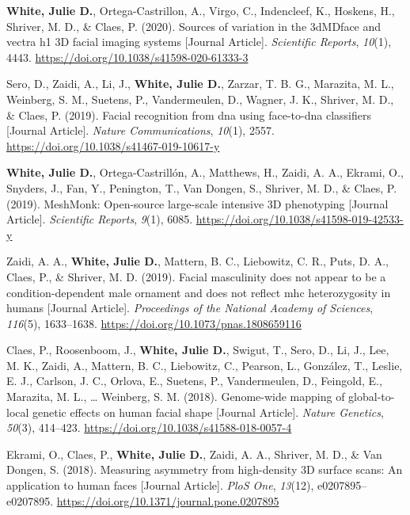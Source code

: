 \documentclass[11pt, a4paper]{awesome-cv}
\begin{document}
\leavevmode\hypertarget{ref-White_2020_CameraVariation}{}%
\textbf{White, Julie D.}, Ortega-Castrillon, A., Virgo, C., Indencleef,
K., Hoskens, H., Shriver, M. D., \& Claes, P. (2020). Sources of
variation in the 3dMDface and vectra h1 3D facial imaging systems
{[}Journal Article{]}. \emph{Scientific Reports}, \emph{10}(1), 4443.
\url{https://doi.org/10.1038/s41598-020-61333-3}

\leavevmode\hypertarget{ref-Sero_2019_FaceToDNA}{}%
Sero, D., Zaidi, A., Li, J., \textbf{White, Julie D.}, Zarzar, T. B. G.,
Marazita, M. L., Weinberg, S. M., Suetens, P., Vandermeulen, D., Wagner,
J. K., Shriver, M. D., \& Claes, P. (2019). Facial recognition from dna
using face-to-dna classifiers {[}Journal Article{]}. \emph{Nature
Communications}, \emph{10}(1), 2557.
\url{https://doi.org/10.1038/s41467-019-10617-y}

\leavevmode\hypertarget{ref-White_2019_MeshMonk}{}%
\textbf{White, Julie D.}, Ortega-Castrillón, A., Matthews, H., Zaidi, A.
A., Ekrami, O., Snyders, J., Fan, Y., Penington, T., Van Dongen, S.,
Shriver, M. D., \& Claes, P. (2019). MeshMonk: Open-source large-scale
intensive 3D phenotyping {[}Journal Article{]}. \emph{Scientific
Reports}, \emph{9}(1), 6085.
\url{https://doi.org/10.1038/s41598-019-42533-y}

\leavevmode\hypertarget{ref-Zaidi_White_2019_Masculinity}{}%
Zaidi, A. A., \textbf{White, Julie D.}, Mattern, B. C., Liebowitz, C.
R., Puts, D. A., Claes, P., \& Shriver, M. D. (2019). Facial masculinity
does not appear to be a condition-dependent male ornament and does not
reflect mhc heterozygosity in humans {[}Journal Article{]}.
\emph{Proceedings of the National Academy of Sciences}, \emph{116}(5),
1633--1638. \url{https://doi.org/10.1073/pnas.1808659116}

\leavevmode\hypertarget{ref-Claes_2018_GlobalToLocal}{}%
Claes, P., Roosenboom, J., \textbf{White, Julie D.}, Swigut, T., Sero,
D., Li, J., Lee, M. K., Zaidi, A., Mattern, B. C., Liebowitz, C.,
Pearson, L., González, T., Leslie, E. J., Carlson, J. C., Orlova, E.,
Suetens, P., Vandermeulen, D., Feingold, E., Marazita, M. L., \ldots{}
Weinberg, S. M. (2018). Genome-wide mapping of global-to-local genetic
effects on human facial shape {[}Journal Article{]}. \emph{Nature
Genetics}, \emph{50}(3), 414--423.
\url{https://doi.org/10.1038/s41588-018-0057-4}

\leavevmode\hypertarget{ref-Ekrami_2018_MeasuringAsymmetry}{}%
Ekrami, O., Claes, P., \textbf{White, Julie D.}, Zaidi, A. A., Shriver,
M. D., \& Van Dongen, S. (2018). Measuring asymmetry from high-density
3D surface scans: An application to human faces {[}Journal Article{]}.
\emph{PloS One}, \emph{13}(12), e0207895--e0207895.
\url{https://doi.org/10.1371/journal.pone.0207895}
\end{document}
